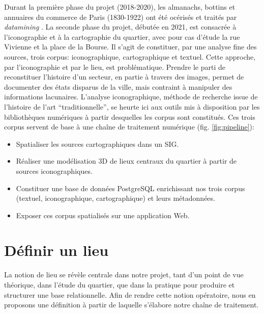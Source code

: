 \documentclass[11pt,french]{article}
\begin{document}
Durant la première phase du projet (2018-2020), les almanachs, bottins et annuaires du commerce de Paris (1830-1922) ont été océrisés et traités par \textit{datamining} \citep{di_leonardo_repopulating_2019}. La seconde phase du projet, débutée en 2021, est consacrée à l’iconographie et à la cartographie du quartier, avec pour cas d’étude la rue Vivienne et la place de la Bourse. Il s’agit de constituer, par une analyse fine des sources, trois corpus: iconographique, cartographique et textuel. Cette approche, par l’iconographie et par le lieu, est problématique. Prendre le parti de reconstituer l’histoire d’un secteur, en partie à travers des images, permet de documenter des états disparus de la ville, mais contraint à manipuler des informations lacunaires. L’analyse iconographique, méthode de recherche issue de l’histoire de l’art \enquote{traditionnelle}, se heurte ici aux outils mis à disposition par les bibliothèques numériques à partir desquelles les corpus sont constitués. Ces trois corpus servent de base à une chaîne de traitement numérique (fig. \ref{fig:pipeline}):

\begin{itemize}
	\item Spatialiser les sources cartographiques dans un SIG.
	\item Réaliser une modélisation 3D de lieux centraux du quartier à partir de sources iconographiques.
	\item Constituer une base de données PostgreSQL enrichissant nos trois corpus (textuel, iconographique, cartographique) et leurs métadonnées.
	\item Exposer ces corpus spatialisés sur une application Web.
\end{itemize}

\section{Définir un lieu}
\label{sec:II}
La notion de lieu se révèle centrale dans notre projet, tant d’un point de vue théorique, dans l’étude du quartier, que dans la pratique pour produire et structurer une base relationnelle. Afin de rendre cette notion opératoire, nous en proposons une définition à partir de laquelle s’élabore notre chaîne de traitement.
\end{document}
